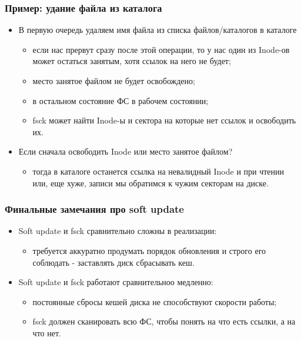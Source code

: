 \begin{frame}
\frametitle{Пример: удание файла из каталога}
\begin{itemize}
  \item В первую очередь удаляем имя файла из списка файлов/каталогов в
  каталоге
  \begin{itemize}
    \item если нас прервут сразу после этой операции, то у нас один из Inode-ов
    может остаться занятым, хотя ссылок на него не будет;
    \item место занятое файлом не будет освобождено;
    \item в остальном состояние ФС в рабочем состоянии;
    \item fsck может найти Inode-ы и сектора на которые нет ссылок и освободить
    их.
  \end{itemize}
  \item Если сначала освободить Inode или место занятое файлом?
  \begin{itemize}
    \item тогда в каталоге останется ссылка на невалидный Inode и при чтении
    или, еще хуже, записи мы обратимся к чужим секторам на диске.
  \end{itemize}
\end{itemize}
\end{frame}

\begin{frame}
\frametitle{Финальные замечания про soft update}
\begin{itemize}
  \item Soft update и fsck сравнительно сложны в реализации:
  \begin{itemize}
    \item требуется аккуратно продумать порядок обновления и строго его
    соблюдать - заставлять диск сбрасывать кеш.
  \end{itemize}
  \item Soft update и fsck работают сравнительноо медленно:
  \begin{itemize}
    \item постоянные сбросы кешей диска не способствуют скорости работы;
    \item fsck должен сканировать всю ФС, чтобы понять на что есть ссылки, а на
    что нет.
  \end{itemize}
\end{itemize}
\end{frame}

